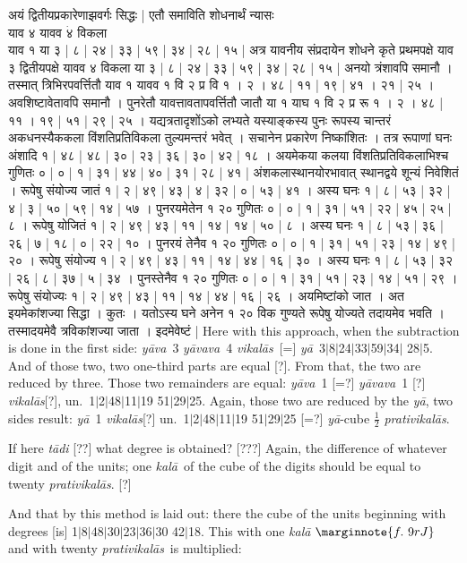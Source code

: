 \documentclass[11pt,a5paper]{book}
\def\kala{\textit{ka\-l\=a}}
\def\prativikalas{\textit{prati\-vi\-ka\-l\=as}}
\def\ya{\textit{y\=a}}
\def\yava{\textit{y\=ava}}
\def\yavava{\textit{y\=avava}}
\def\vikalas{\textit{vi\-ka\-l\=as}}
\def\danda{$|$}
\begin{document}
{\newpage
{\s अयं द्वितीयप्रकारेणाझवर्गः सिद्धः | एतौ समाविति शोधनार्थं न्यासः \\ 
याव ४ यावव $\dot{४}$ विकला \\
याव १ या ३ | ८ | २४ | ३३ | ५९ | ३४ | २८ | १५ | अत्र यावनीय 
संप्रदायेन शोधने कृते प्रथमपक्षे याव ३ द्वितीयपक्षे यावव ४ विकला या ३ | ८ | २४ |
३३ | ५९ | ३४ | २८ | १५ | अनयो त्रंशावपि समानौ ।
तस्मात् त्रिभिरपवर्त्तितौ याव १ यावव १ वि २ प्र वि १ । २ । ४८ | ११ |
१९ | ४१ । २१ | २५ । अवशिष्टावेतावपि समानौ । 
पुनरेतौ यावत्तावतापवर्त्तितौ जातौ या १ याघ १ वि २ प्र रू १ । २ । ४८ | ११ । १९ | ५१ | २९ | २५ । 
यद्यत्रतादृशोंऽको लभ्यते यस्याङ्कस्य पुनः रूपस्य चान्तरं अकधनस्यैककला विंशतिप्रतिविकला तुल्यमन्तरं भवेत् ।
सचानेन प्रकारेण निष्कांशितः । तत्र रूपाणां घनः अंशादि १ | ४८ | ४८ | ३० | २३ | ३६ | ३० | ४२ | १८ । 
अयमेकया कलया विंशतिप्रतिविकलाभिश्च गुणितः ० | ० | १ | ३१ | ४४ | ४० | ३१ | २८ | ४१ | 
अंशकलास्थानयोरभावात् स्थानद्वये शून्यं निवेशितं । 
रूपेषु संयोज्य जातं १ | २ | ४९ | ४३ | ४ | ३२ | ० | ५३ | ४१ । 
अस्य घनः १ | ८ | ५३ | ३२ | ४ | ३ | ५० | ५९ | १४ | ५७ । 
पुनरयमेतेन १ २० गुणितः ० | ० | १ | ३१ | ५१ | २२ | ४५ | २५ | ८ । 
रूपेषु योजितं १ | २ | ४९ | ४३ | ११ | १४ | १४ | ५० | ८ । 
अस्य घनः १ | ८ | ५३ | ३६ | २६ | ७ | १८ | ० | २२ | १० । 
पुनरयं तेनैव १ २० गुणितः ० | ० | १ | ३१ | ५१ | २३ | १४ | ४९ | २० । 
रूपेषु संयोज्य १ | २ | ४९ | ४३ | ११ | १४ | ४४ | १६ | ३० । 
अस्य घनः १ | ८ | ५३ | ३२ | २६ | ८ | ३७ | ५ | ३४ । 
पुनस्तेनैव १ २० गुणितः ० | ० | १ | ३१ | ५१ | २३ | १४ | ५१ | २९ ।
रूपेषु संयोज्यः १ | २ | ४९ | ४३ | ११ | १४ | ४४ | १६ | २६ । 
अयमिष्टांको जात । अत इयमेकांशज्या सिद्धा । कुतः । यतोऽस्य घने अनेन १ २० विक 
गुण्यते रूपेषु योज्यते तदायमेव भवति । तस्मादयमेवै त्रविकांशज्या जाता । इदमेवेष्टं |}
\newpage
Here with this approach, when the subtraction is done in the first side:
\yava\ 3 \yavava\ 4 \vikalas\ [=] \ya\ 3\danda 8\danda 24\danda 33\danda 59\danda 34\danda
28\danda 5. And of those two, two one-third parts are equal [?]. 
From that, the two are reduced by three. Those two remainders are equal:
\yava\ 1 [=?] \yavava\ 1 [?] \vikalas [?], un.\ 1\danda 2\danda 48\danda 11\danda 19
51\danda 29\danda 25.
Again, those two are reduced by the \ya, two sides result: 
\ya\ 1 \vikalas [?] un.\  1\danda 2\danda 48\danda 11\danda 19
51\danda 29\danda 25 [=?] \ya-cube $\frac{1}{2}$ \prativikalas.

If here \textit{t\=adi} [??] what degree is obtained?  [???] 
Again, the difference of whatever digit and of the units; one \kala\ of the cube of the digits
should be equal to twenty \prativikalas. [?]

And that by this method is laid out: there the cube of the units beginning with degrees [is]
1\danda 8\danda 48\danda 30\danda 23\danda 36\danda 30 42\danda 18.
This with one \kala
$\marginnote{f.~9r J}$
and with twenty \prativikalas\ is multiplied: 

}
\end{document}
